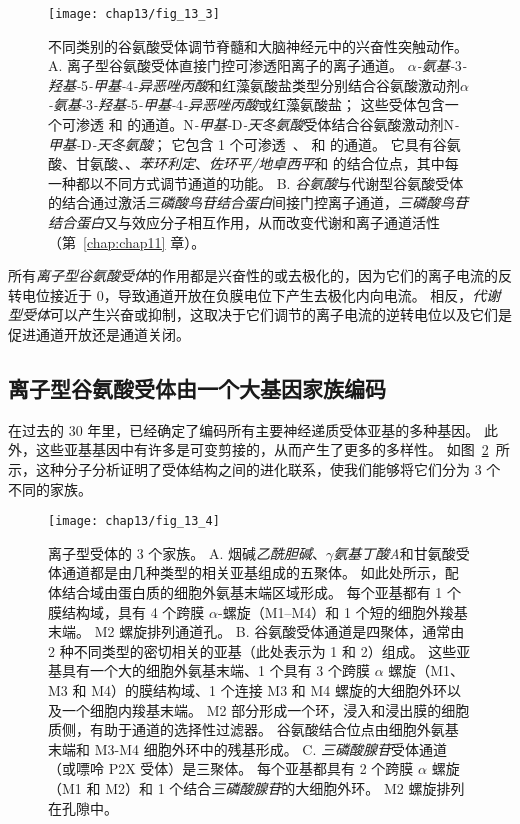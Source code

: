 \begin{figure}[htbp]
	\centering
	\texttt{[image: chap13/fig\_13\_3]}
	\caption{不同类别的谷氨酸受体调节脊髓和大脑神经元中的兴奋性突触动作。
		A. 离子型谷氨酸受体直接门控可渗透阳离子的离子通道。
		\textit{$\alpha$-氨基-}3\textit{-羟基-}5\textit{-甲基-}4\textit{-异恶唑丙酸}和红藻氨酸盐类型分别结合谷氨酸激动剂\textit{$\alpha$-氨基-}3\textit{-羟基-}5\textit{-甲基-}4\textit{-异恶唑丙酸}或红藻氨酸盐；
		这些受体包含一个可渗透  和  的通道。N\textit{-甲基-}D\textit{-天冬氨酸}受体结合谷氨酸激动剂N\textit{-甲基-}D\textit{-天冬氨酸}；
		它包含 1 个可渗透~、 和  的通道。
		它具有谷氨酸、甘氨酸、、\textit{苯环利定}、\textit{佐环平/地卓西平}和  的结合位点，其中每一种都以不同方式调节通道的功能。
		B. \textit{谷氨酸}与代谢型谷氨酸受体的结合通过激活\textit{三磷酸鸟苷结合蛋白}间接门控离子通道，\textit{三磷酸鸟苷结合蛋白}又与效应分子相互作用，从而改变代谢和离子通道活性（第~\ref{chap:chap11} 章）。}
	\label{fig:13_3}
\end{figure}


所有\textit{离子型谷氨酸受体}的作用都是兴奋性的或去极化的，因为它们的离子电流的反转电位接近于 0，导致通道开放在负膜电位下产生去极化内向电流。
相反，\textit{代谢型受体}可以产生兴奋或抑制，这取决于它们调节的离子电流的逆转电位以及它们是促进通道开放还是通道关闭。



\subsection{离子型谷氨酸受体由一个大基因家族编码}

在过去的 30 年里，已经确定了编码所有主要神经递质受体亚基的多种基因。
此外，这些亚基基因中有许多是可变剪接的，从而产生了更多的多样性。
如图~\ref{fig:13_4}~所示，这种分子分析证明了受体结构之间的进化联系，使我们能够将它们分为 3 个不同的家族。


\begin{figure}[htbp]
	\centering
	\texttt{[image: chap13/fig\_13\_4]}
	\caption{离子型受体的 3 个家族。
		A. 烟碱\textit{乙酰胆碱}、\textit{$\gamma$氨基丁酸A}和甘氨酸受体通道都是由几种类型的相关亚基组成的五聚体。
		如此处所示，配体结合域由蛋白质的细胞外氨基末端区域形成。
		每个亚基都有 1 个膜结构域，具有 4 个跨膜 $\alpha$-螺旋（M1–M4）和 1 个短的细胞外羧基末端。
		M2 螺旋排列通道孔。
		B. 谷氨酸受体通道是四聚体，通常由 2 种不同类型的密切相关的亚基（此处表示为 1 和 2）组成。
		这些亚基具有一个大的细胞外氨基末端、1 个具有 3 个跨膜 $\alpha$ 螺旋（M1、M3 和 M4）的膜结构域、1 个连接 M3 和 M4 螺旋的大细胞外环以及一个细胞内羧基末端。
		M2 部分形成一个环，浸入和浸出膜的细胞质侧，有助于通道的选择性过滤器。
		谷氨酸结合位点由细胞外氨基末端和 M3-M4 细胞外环中的残基形成。
		C. \textit{三磷酸腺苷}受体通道（或嘌呤 P2X 受体）是三聚体。
		每个亚基都具有 2 个跨膜 $\alpha$ 螺旋（M1 和 M2）和 1 个结合\textit{三磷酸腺苷}的大细胞外环。
		M2 螺旋排列在孔隙中。}
	\label{fig:13_4}
\end{figure}


